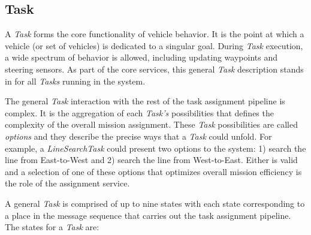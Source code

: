 \subsection{Task}\label{task}

A \emph{Task} forms the core functionality of vehicle behavior. It is
the point at which a vehicle (or set of vehicles) is dedicated to a
singular goal. During \emph{Task} execution, a wide spectrum of behavior
is allowed, including updating waypoints and steering sensors. As part
of the core services, this general \emph{Task} description stands in for
all \emph{Tasks} running in the system.

The general \emph{Task} interaction with the rest of the task assignment
pipeline is complex. It is the aggregation of each \emph{Task's}
possibilities that defines the complexity of the overall mission
assignment. These \emph{Task} possibilities are called \emph{options}
and they describe the precise ways that a \emph{Task} could unfold. For
example, a \emph{LineSearchTask} could present two options to the
system: 1) search the line from East-to-West and 2) search the line from
West-to-East. Either is valid and a selection of one of these options
that optimizes overall mission efficiency is the role of the assignment
service.

A general \emph{Task} is comprised of up to nine states with each state
corresponding to a place in the message sequence that carries out the
task assignment pipeline. The states for a \emph{Task} are:

